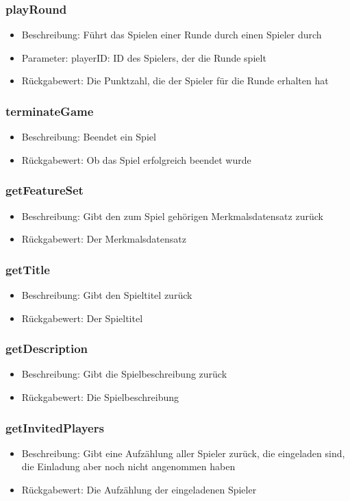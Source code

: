 \documentclass[a4paper]{scrreprt}
\begin{document}
	\subsubsection{playRound}
	\begin{itemize}
		\item Beschreibung: Führt das Spielen einer Runde durch einen Spieler durch
		\item Parameter: playerID: ID des Spielers, der die Runde spielt
		\item Rückgabewert: Die Punktzahl, die der Spieler für die Runde erhalten hat
	\end{itemize}
	\subsubsection{terminateGame}
	\begin{itemize}
		\item Beschreibung: Beendet ein Spiel
		\item Rückgabewert: Ob das Spiel erfolgreich beendet wurde
	\end{itemize}
	\subsubsection{getFeatureSet}
	\begin{itemize}
		\item Beschreibung: Gibt den zum Spiel gehörigen Merkmalsdatensatz zurück
		\item Rückgabewert: Der Merkmalsdatensatz
	\end{itemize}
	\subsubsection{getTitle}
	\begin{itemize}
		\item Beschreibung: Gibt den Spieltitel zurück
		\item Rückgabewert: Der Spieltitel
	\end{itemize}
	\subsubsection{getDescription}
	\begin{itemize}
		\item Beschreibung: Gibt die Spielbeschreibung zurück
		\item Rückgabewert: Die Spielbeschreibung
	\end{itemize}
	\subsubsection{getInvitedPlayers}
	\begin{itemize}
		\item Beschreibung: Gibt eine Aufzählung aller Spieler zurück, die eingeladen sind, die Einladung aber noch nicht angenommen haben
		\item Rückgabewert: Die Aufzählung der eingeladenen Spieler
	\end{itemize}
\end{document}
